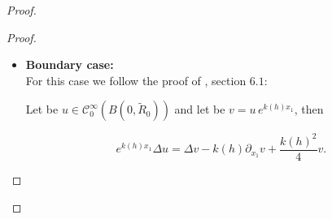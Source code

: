 \documentclass[leqno,11pt,letterpaper, english]{amsart}
\newcommand{\nn}{\nonumber}
\theoremstyle{plain}
\theoremstyle{definition}
\numberwithin{equation}{section}
\begin{document}
\begin{proof}
\begin{proof}
\begin{itemize}
				By Garding inequality (see for example \cite{alinhac2007pseudo}), we obtain for $h$ small enough:
				
				\begin{align}
					& k(h)\Biggl\langle \left[\left(e^{k(h)\omega(r)}(k(h)^{-2}\Delta)e^{-k(h)\omega(r)}\right)^*,e^{k(h)\omega(r)}(k(h)^{-2}\Delta)e^{-k(h)\omega(r)}   \right]v,v \Biggr\rangle \nn\\
					&+d\bigg\|e^{k(h)\omega(r)}(k(h)^{-2}\Delta)e^{-k(h)\omega(r)}v\bigg\|_{L^2}^2\geq \frac{\tilde{C}}{2}\|v \big\|_{H^2}^2
				\end{align}
				
				for $v \in \mathcal{C}_0^{\infty}(B(0,R_0)\setminus \frac{1}{2}B(R'))$. 
				Furthermore:
				
				\begin{align}
					&k(h) \Biggl\langle \left[\left(e^{k(h)\omega(r)}(k(h)^{-2}\Delta)e^{-k(h)\omega(r)}\right)^*,e^{k(h)\omega(r)}(k(h)^{-2}\Delta)e^{-k(h)\omega(r)}   \right]v,v \Biggr\rangle\nn\\
					&= k(h)\Bigg\|e^{k(h)\omega(r)}(k(h)^{-2}\Delta)e^{-k(h)\omega(r)}v\Bigg\|_{L^2}^2- k(h)\Bigg\|\left(e^{k(h)\omega(r)}(k(h)^{-2}\Delta)e^{-k(h)\omega(r)}\right)^*v\Bigg\|_{L^2}^2\nn\\
					&\leq  k(h)\Bigg\|e^{k(h)\omega(r)}(k(h)^{-2}\Delta)e^{-k(h)\omega(r)}v\Bigg\|_{L^2}^2.
				\end{align}
				
				So by replacing the $H^2$ norm by an $L^2$ norm, we obtain:
				
				\begin{equation}
					\Big\|e^{k(h)\omega(r)}(k(h)^{-2}\Delta)e^{-k(h)\omega(r)}v \Big\|_{L^2}^2\geq \frac{ C_0}{k(h)}\big\|v \big\|_{L^2}^2
				\end{equation}
				
				
				for $v \in \mathcal{C}_0^{\infty}(B(0,\tilde{R}_0)\setminus \frac{1}{2} B(0,\tilde{R}))$.
				Thus, with $v=u\,e^{k(h)\omega(|x|)}$ we proved the first case.
				\hfill\\
				\item\textbf{Boundary case:}\\
				For this case we follow the proof of \cite{logunov2020landisconjectureexponentialdecay}, section $6.1$:
				
				Let be $u \in \mathcal{C}_0^\infty (B(0,\tilde{R}_0))$ and let be $v=u\,e^{k(h)x_1}$, then 
				
				\begin{equation}
					e^{k(h)x_1}\Delta u= \Delta v -k(h)\partial_{x_1}v +\frac{k(h)^2}{4}v.
				\end{equation}
				

\end{itemize}
\end{proof}
\end{proof}
\end{document}
